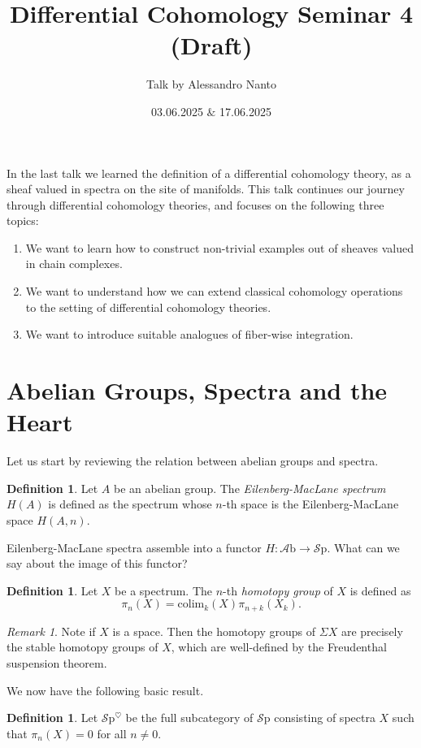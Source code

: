 \documentclass[10pt]{amsart}
\title{Differential Cohomology Seminar 4 (Draft)}
\date{03.06.2025 $\&$ 17.06.2025}
\author{Talk by Alessandro Nanto}
\newcommand{\Sp}{\mathscr{S}\mathrm{p}}
\newcommand{\colim}{\mathrm{colim}}
\newcommand{\Ab}{\mathscr{A}\mathrm{b}}
\theoremstyle{definition}
\newtheorem{definition}[equation]{Definition}
\theoremstyle{remark}
\newtheorem{remark}[equation]{Remark}
\begin{document}
\maketitle

In the last talk we learned the definition of a differential cohomology theory, as a sheaf valued in spectra on the site of manifolds. This talk continues our journey through differential cohomology theories, and focuses on the following three topics:
\begin{enumerate}
  \item We want to learn how to construct non-trivial examples out of sheaves valued in chain complexes.
  \item We want to understand how we can extend classical cohomology operations to the setting of differential cohomology theories.
  \item We want to introduce suitable analogues of fiber-wise integration.  
\end{enumerate}

\section{Abelian Groups, Spectra and the Heart}
Let us start by reviewing the relation between abelian groups and spectra. 

\begin{definition}
  Let $A$ be an abelian group. The \emph{Eilenberg-MacLane spectrum} $H(A)$ is defined as the spectrum whose $n$-th space is the Eilenberg-MacLane space $H(A,n)$.
\end{definition}

Eilenberg-MacLane spectra assemble into a functor $H\colon \Ab \to \Sp$. What can we say about the image of this functor?

\begin{definition}
  Let $X$ be a spectrum. The $n$-th \emph{homotopy group} of $X$ is defined as 
  \[\pi_n(X)  = \colim_{k}(X) \pi_{n+k}(X_k).\]
\end{definition}

\begin{remark}
  Note if $X$ is a space. Then the homotopy groups of $\Sigma X$ are precisely the stable homotopy groups of $X$, which are well-defined by the Freudenthal suspension theorem.
\end{remark}

We now have the following basic result. 

\begin{definition}
  Let $\Sp^{\heartsuit}$ be the full subcategory of $\Sp$ consisting of spectra $X$ such that $\pi_n(X) = 0$ for all $n \neq 0$.
\end{definition}
\end{document}
